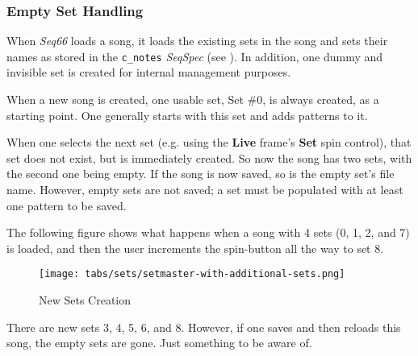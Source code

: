 \subsubsection{Empty Set Handling}
\label{subsubsec:setmaster_empty_sets}

   When \textsl{Seq66} loads a song, it loads the existing sets in the song and
   sets their names as stored in the \texttt{c\_notes} \textsl{SeqSpec}
   (see ).
   In addition, one dummy and invisible set is created for internal management
   purposes.

   When a new song is created, one usable set, Set \#0, is always created, as a
   starting point.  One generally starts with this set and adds patterns to it.

   When one selects the next set (e.g. using the \textbf{Live} frame's
   \textbf{Set} spin control), that set does not exist, but is immediately
   created.  So now the song has two sets, with the second one being empty.
   If the song is now saved, so is the empty set's file name.  However, empty
   sets are not saved; a set must be populated with at least one pattern to be
   saved.

   The following figure shows what happens when a song with 4 sets (0, 1, 2,
   and 7) is loaded, and then the user increments the spin-button all the way
   to set 8.

\begin{figure}[H]
   \centering 
   \texttt{[image: tabs/sets/setmaster-with-additional-sets.png]}
   \caption{New Sets Creation}
   \label{fig:setmaster_set_creation}
\end{figure}

   There are new sets 3, 4, 5, 6, and 8.  However, if one saves and then
   reloads this song, the empty sets are gone.  Just something to be aware of.

